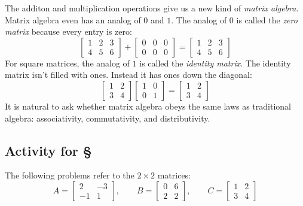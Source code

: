 \documentclass[11pt,oneside]{amsbook}
\theoremstyle{definition}
\theoremstyle{plain}
\theoremstyle{definition}
\theoremstyle{remark}
\numberwithin{equation}{section}
\numberwithin{figure}{section}
\begin{document}
The additon and multiplication operations give us a new kind of \emph{matrix algebra}. Matrix algebra even has an analog of $0$ and $1$. The analog of $0$ is called the \emph{zero matrix} because every entry is zero:
\[\begin{bmatrix}1&2&3\\4&5&6\end{bmatrix}
  +\begin{bmatrix}0&0&0\\0&0&0\end{bmatrix}
  =\begin{bmatrix}1&2&3\\4&5&6\end{bmatrix}
\]
For square matrices, the analog of $1$ is called the \emph{identity matrix}. The identity matrix isn't filled with ones. Instead it has ones down the diagonal:
\[\begin{bmatrix}1&2\\3&4\end{bmatrix}
  \begin{bmatrix}1&0\\0&1\end{bmatrix}
  =\begin{bmatrix}1&2\\3&4\end{bmatrix}
\]
It is natural to ask whether matrix algebra obeys the same laws as traditional algebra: associativity, commutativity, and distributivity.

\newpage
\subsection*{Activity for \S \thesection}

\noindent The following problems refer to the $2\times2$ matrices:
\[A=\begin{bmatrix}2&-3\\-1&1\end{bmatrix},\qquad
  B=\begin{bmatrix}0&6\\2&2\end{bmatrix},\qquad
  C=\begin{bmatrix}1&2\\3&4\end{bmatrix}
\]
\end{document}
